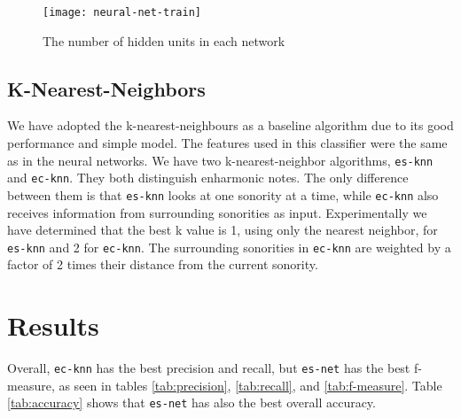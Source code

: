 \documentclass{article}
\begin{document}
\begin{figure}
  \centering
  \texttt{[image: neural-net-train]}
  \caption{The number of hidden units in each network}
  \label{fig:hidden-units}
\end{figure}


\subsection{K-Nearest-Neighbors}
\label{sec:knn}

We have adopted the k-nearest-neighbours as a baseline algorithm due
to its good performance \cite{fix.ea:important, gomez.ea:estimating}
and simple model. The features used in this classifier were the same
as in the neural networks. We have two k-nearest-neighbor algorithms,
\texttt{es-knn} and \texttt{ec-knn}. They both distinguish enharmonic
notes. The only difference between them is that \texttt{es-knn} looks
at one sonority at a time, while \texttt{ec-knn} also receives
information from surrounding sonorities as input. Experimentally we
have determined that the best k value is 1, using only the nearest
neighbor, for \texttt{es-knn} and 2 for \texttt{ec-knn}. The
surrounding sonorities in \texttt{ec-knn} are weighted by a factor of
2 times their distance from the current sonority.

\section{Results}
\label{sec:discussion}


Overall, \texttt{ec-knn} has the best precision and recall, but
\texttt{es-net} has the best f-measure, as seen in tables
\ref{tab:precision}, \ref{tab:recall}, and \ref{tab:f-measure}. Table
\ref{tab:accuracy} shows that \texttt{es-net} has also the best
overall accuracy.
\end{document}
